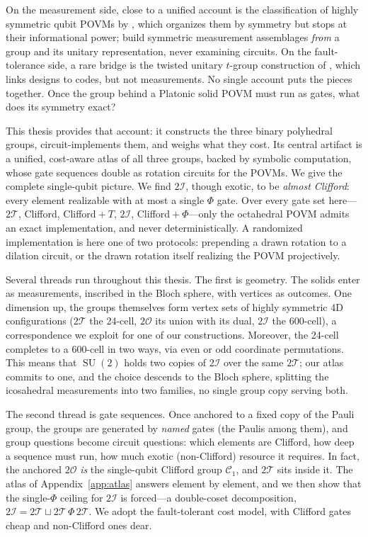\documentclass[11pt, oneside, openany]{scrbook}
\DeclareMathOperator{\SU}{SU}
\newcommand{\Tgroup}{\mathcal{T}}  %
\newcommand{\Ogroup}{\mathcal{O}}  %
\newcommand{\Igroup}{\mathcal{I}}  %
\newcommand{\TwoT}{2\Tgroup}
\newcommand{\TwoO}{2\Ogroup}
\newcommand{\TwoI}{2\Igroup}
\begin{document}
On the measurement side, close to a unified account is the classification of highly symmetric qubit POVMs by \textcite{slomczynski2015highlysymmetricpovms}, which organizes them by symmetry but stops at their informational power; \textcite{nguyen2020symmetriesmeasurementsquantum} build symmetric measurement assemblages \textit{from} a group and its unitary representation, never examining circuits. On the fault-tolerance side, a rare bridge is the twisted unitary $t$-group construction of \textcite{kubischta2024quantumcodestwisted}, which links designs to codes, but not measurements. No single account puts the pieces together. Once the group behind a Platonic solid POVM must run as gates, what does its symmetry exact?

This thesis provides that account: it constructs the three binary polyhedral groups, circuit-implements them, and weighs what they cost. Its central artifact is a unified, cost-aware atlas of all three groups, backed by symbolic computation, whose gate sequences double as rotation circuits for the POVMs. We give the complete single-qubit picture. We find $\TwoI$, though exotic, to be \textit{almost Clifford}: every element realizable with at most a single $\Phi$ gate. Over every gate set here---$\TwoT$, Clifford, Clifford${}+T$, $\TwoI$, Clifford${}+\Phi$---only the octahedral POVM admits an exact implementation, and never deterministically. A randomized implementation is here one of two protocols: prepending a drawn rotation to a dilation circuit, or the drawn rotation itself realizing the POVM projectively.

Several threads run throughout this thesis. The first is geometry. The solids enter as measurements, inscribed in the Bloch sphere, with vertices as outcomes. One dimension up, the groups themselves form vertex sets of highly symmetric 4D configurations ($\TwoT$ the 24-cell, $\TwoO$ its union with its dual, $\TwoI$ the 600-cell), a correspondence we exploit for one of our constructions. Moreover, the 24-cell completes to a 600-cell in two ways, via even or odd coordinate permutations. This means that $\SU(2)$ holds two copies of $\TwoI$ over the same $\TwoT$; our atlas commits to one, and the choice descends to the Bloch sphere, splitting the icosahedral measurements into two families, no single group copy serving both.

The second thread is gate sequences. Once anchored to a fixed copy of the Pauli group, the groups are generated by \textit{named} gates (the Paulis among them), and group questions become circuit questions: which elements are Clifford, how deep a sequence must run, how much exotic (non-Clifford) resource it requires. In fact, the anchored $\TwoO$ \textit{is} the single-qubit Clifford group $\mathcal{C}_1$, and $\TwoT$ sits inside it. The atlas of Appendix~\ref{app:atlas} answers element by element, and we then show that the single-$\Phi$ ceiling for $\TwoI$ is forced---a double-coset decomposition, $\TwoI = \TwoT \sqcup \TwoT\,\Phi\,\TwoT$. We adopt the fault-tolerant cost model, with Clifford gates cheap and non-Clifford ones dear.
\end{document}
